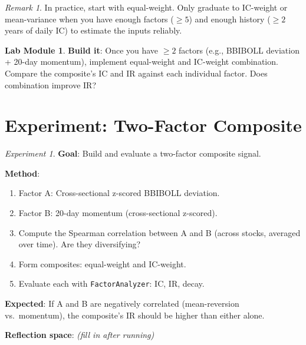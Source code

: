 \documentclass[a4paper, 11pt]{report}
\theoremstyle{definition}
\newtheorem{labmod}{Lab Module}[chapter]
\theoremstyle{remark}
\newtheorem{remark}{Remark}[chapter]
\newtheorem{experiment}{Experiment}[chapter]
\begin{document}
\begin{remark}
    In practice, start with equal-weight.  Only graduate to IC-weight or
    mean-variance when you have enough factors ($\geq 5$) and enough history
    ($\geq 2$ years of daily IC) to estimate the inputs reliably.
\end{remark}

\begin{labmod}
    \textbf{Build it}: Once you have $\geq 2$ factors (e.g., BBIBOLL deviation
    + 20-day momentum), implement equal-weight and IC-weight combination.
    Compare the composite's IC and IR against each individual factor.  Does
    combination improve IR?
\end{labmod}

\section{Experiment: Two-Factor Composite}

\begin{experiment}
    \textbf{Goal}: Build and evaluate a two-factor composite signal.

    \textbf{Method}:
    \begin{enumerate}
        \item Factor A: Cross-sectional z-scored BBIBOLL deviation.
        \item Factor B: 20-day momentum (cross-sectional z-scored).
        \item Compute the Spearman correlation between A and B (across stocks,
              averaged over time).  Are they diversifying?
        \item Form composites: equal-weight and IC-weight.
        \item Evaluate each with \texttt{FactorAnalyzer}: IC, IR, decay.
    \end{enumerate}

    \textbf{Expected}: If A and B are negatively correlated (mean-reversion vs.\
    momentum), the composite's IR should be higher than either alone.

    \textbf{Reflection space}: \emph{(fill in after running)}
\end{experiment}


\end{document}
